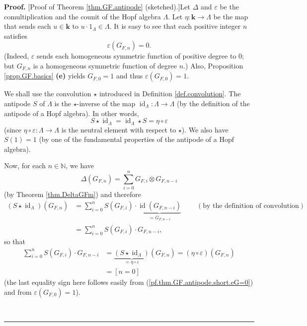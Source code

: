 \documentclass[numbers=enddot,12pt,final,onecolumn,notitlepage]{scrartcl}%
\theoremstyle{definition}
\newenvironment{proof}[1][Proof]{\noindent\textbf{#1.} }{\ \rule{0.5em}{0.5em}}
\let\sumnonlimits\sum
\renewcommand{\sum}{\sumnonlimits\limits}
\newenvironment{vershort}{}{}
\begin{document}
\begin{vershort}
\begin{proof}
[Proof of Theorem \ref{thm.GF.antipode} (sketched).]Let $\Delta$ and
$\varepsilon$ be the comultiplication and the counit of the Hopf algebra
$\Lambda$. Let $\eta:\mathbf{k}\rightarrow\Lambda$ be the map that sends each
$u\in\mathbf{k}$ to $u\cdot1_{\Lambda}\in\Lambda$. It is easy to see that each
positive integer $n$ satisfies%
\begin{equation}
\varepsilon\left(  G_{F,n}\right)  =0. \label{pf.thm.GF.antipode.short.eG=0}%
\end{equation}
(Indeed, $\varepsilon$ sends each homogeneous symmetric function of positive
degree to $0$; but $G_{F,n}$ is a homogeneous symmetric function of degree
$n$.) Also, Proposition \ref{prop.GF.basics} \textbf{(e)} yields $G_{F,0}=1$
and thus $\varepsilon\left(  G_{F,0}\right)  =1$.

We shall use the convolution $\star$ introduced in Definition
\ref{def.convolution}. The antipode $S$ of $\Lambda$ is the $\star$-inverse of
the map $\operatorname*{id}\nolimits_{\Lambda}:\Lambda\rightarrow\Lambda$ (by
the definition of the antipode of a Hopf algebra). In other words,%
\[
S\star\operatorname*{id}\nolimits_{\Lambda}=\operatorname*{id}%
\nolimits_{\Lambda}\star S=\eta\circ\varepsilon
\]
(since $\eta\circ\varepsilon:\Lambda\rightarrow\Lambda$ is the neutral element
with respect to $\star$). We also have $S\left(  1\right)  =1$ (by one of the
fundamental properties of the antipode of a Hopf algebra).

Now, for each $n\in\mathbb{N}$, we have%
\[
\Delta\left(  G_{F,n}\right)  =\sum_{i=0}^{n}G_{F,i}\otimes G_{F,n-i}%
\]
(by Theorem \ref{thm.DeltaGFm}) and therefore%
\begin{align*}
\left(  S\star\operatorname*{id}\nolimits_{\Lambda}\right)  \left(
G_{F,n}\right)   &  =\sum_{i=0}^{n}S\left(  G_{F,i}\right)  \cdot
\underbrace{\operatorname*{id}\left(  G_{F,n-i}\right)  }_{=G_{F,n-i}%
}\ \ \ \ \ \ \ \ \ \ \left(  \text{by the definition of convolution}\right) \\
&  =\sum_{i=0}^{n}S\left(  G_{F,i}\right)  \cdot G_{F,n-i},
\end{align*}
so that%
\begin{align}
\sum_{i=0}^{n}S\left(  G_{F,i}\right)  \cdot G_{F,n-i}  &
=\underbrace{\left(  S\star\operatorname*{id}\nolimits_{\Lambda}\right)
}_{=\eta\circ\varepsilon}\left(  G_{F,n}\right)  =\left(  \eta\circ
\varepsilon\right)  \left(  G_{F,n}\right) \nonumber\\
&  =\left[  n=0\right]  \label{pf.thm.GF.antipode.short.SGG}%
\end{align}
(the last equality sign here follows easily from
(\ref{pf.thm.GF.antipode.short.eG=0}) and from $\varepsilon\left(
G_{F,0}\right)  =1$).


\end{proof}
\end{vershort}
\end{document}
